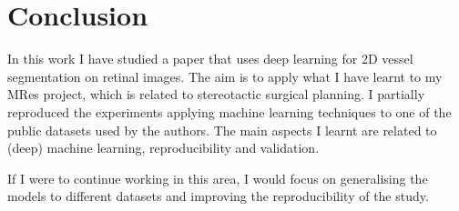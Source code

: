 \section{Conclusion}


In this work I have studied a paper that uses deep learning for 2D vessel segmentation on retinal images. The aim is to apply what I have learnt to my MRes project, which is related to stereotactic surgical planning. I partially reproduced the experiments applying machine learning techniques to one of the public datasets used by the authors. The main aspects I learnt are related to (deep) machine learning, reproducibility and validation.



If I were to continue working in this area, I would focus on generalising the models to different datasets and improving the reproducibility of the study.
